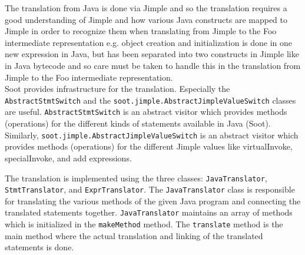 \documentclass{article}
\newcommand{\code}[1]{\texttt{\small #1}}
\begin{document}
The translation from Java is done via Jimple and so the translation
requires a good understanding of Jimple and how various Java
constructs are mapped to Jimple in order to recognize them when
translating from Jimple to the Foo intermediate representation
e.g. object creation and initialization is done in one new expression
in Java, but has been separated into two constructs in Jimple like in
Java bytecode and so care must be taken to handle this in the
translation from Jimple to the Foo intermediate representation.\\

Soot provides infrastructure for the translation. Especially the
\code{AbstractStmt\-Switch} and the
\code{soot.jimple.AbstractJimpleValueSwitch} classes are
useful. \linebreak \code{AbstractStmtSwitch} is an abstract visitor
which provides methods (operations) for the different kinds of
statements available in Java (Soot). Similarly,
\code{soot.\-jimple.AbstractJimpleValueSwitch} is an abstract visitor
which provides methods (operations) for the different Jimple values
like virtualInvoke, specialInvoke, and add expressions.

The translation is implemented using the three classes:
\code{JavaTranslator}, \code{StmtTranslator}, and
\code{ExprTranslator}. The \code{JavaTranslator} class is responsible
for translating the various methods of the given Java program and
connecting the translated statements together. \code{JavaTranslator}
maintains an array of methods which is initialized in the
\code{makeMethod} method. The \code{translate} method is the main
method where the actual translation and linking of the translated
statements is done.
\end{document}
